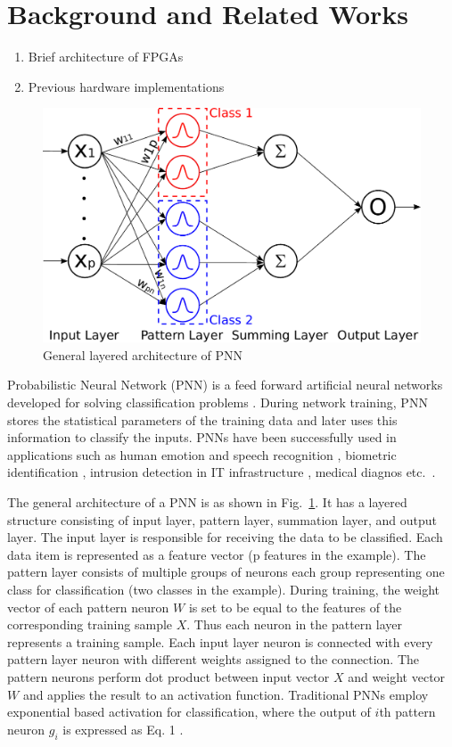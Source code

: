 \section{Background and Related Works}
\label{sec_related}

\begin{enumerate}
\item Brief architecture of FPGAs
\item Previous hardware implementations
\end{enumerate}


\begin{figure}[t]
\centering
   \includegraphics[height=0.6\columnwidth]{Figures/pnn.pdf}
   \caption{General layered architecture of PNN}
   \label{fig:pnn}
\end{figure}

Probabilistic Neural Network (PNN) is a feed forward artificial neural networks developed for solving classification problems \cite{specht1990}.
During network training, PNN stores the statistical parameters of the training data and later uses this information to classify the inputs.
PNNs have been successfully used in applications such as human emotion \cite{zhang2016pnn} and speech recognition \cite{wrobel2017}, biometric identification \cite{junjea2015}, intrusion detection in IT infrastructure \cite{raman2017,zhao2017}, medical diagnos etc.~\cite{mangayarkarasi2017,thara2016}.


The general architecture of a PNN is as shown in Fig.~\ref{fig:pnn}.
It has a layered structure consisting of input layer, pattern layer, summation layer, and output layer. 
The input layer is responsible for receiving the data to be classified. 
Each data item is represented as a feature vector (p features in the example).
The pattern layer consists of multiple groups of neurons each group representing one class for classification (two classes in the example).
During training, the weight vector of each pattern neuron $W$ is set to be equal to the features of the corresponding training sample $X$.
Thus each neuron in the pattern layer represents a training sample.
Each input layer neuron is connected with every pattern layer neuron with different weights assigned to the connection. 
The pattern neurons perform dot product between input vector $X$ and weight vector $W$ and applies the result to an activation function. 
Traditional PNNs employ exponential based activation for classification, where the output of $i$th pattern neuron $g_i$ is expressed as Eq. 1 \cite{specht1988}.


